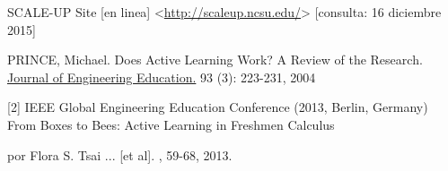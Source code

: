 

\begin{thebibliography}{9}

    SCALE-UP Site [en linea]
    <\url{http://scaleup.ncsu.edu/}>
    [consulta: 16 diciembre 2015]

    PRINCE, Michael.
    Does Active Learning Work? A Review of the Research.
    \uline{Journal of Engineering Education.}
    93 (3): 223-231, 2004

    [2]
    IEEE Global Engineering Education Conference
    (2013, Berlin, Germany)
    From Boxes to Bees:
    Active Learning in Freshmen Calculus

    por Flora S. Tsai ... [et al].
    , 59-68, 2013.
%
%
%

\end{thebibliography}
